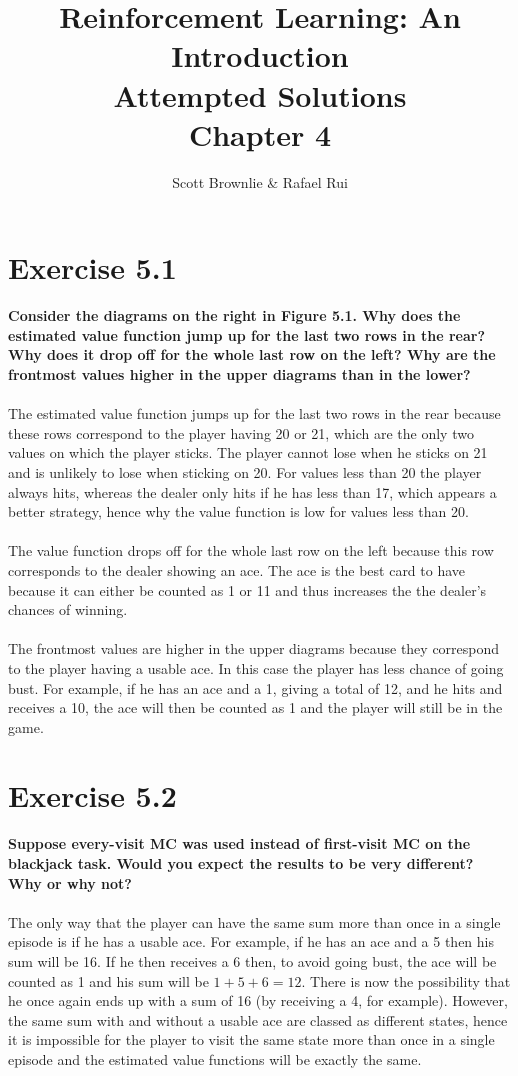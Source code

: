 \documentclass[a4paper,11pt]{article}
\title{Reinforcement Learning: An Introduction \\ Attempted Solutions \\ Chapter 4}
\author{Scott Brownlie \& Rafael Rui}
\date{}
\numberwithin{equation}{section}
\theoremstyle{remark}
\begin{document}
\maketitle

\section{Exercise 5.1}

\textbf{Consider the diagrams on the right in Figure 5.1. Why does the estimated value function jump up for the last two rows in the rear? Why does it drop off for the whole last row on the left? Why are the frontmost values higher in the upper diagrams than in the lower?}
\\ \\
The estimated value function jumps up for the last two rows in the rear because these rows correspond to the player having 20 or 21, which are the only two values on which the player sticks. The player cannot lose when he sticks on 21 and is unlikely to lose when sticking on 20. For values less than 20 the player always hits, whereas the dealer only hits if he has less than 17, which appears a better strategy, hence why the value function is low for values less than 20.
\\ \\
The value function drops off for the whole last row on the left because this row corresponds to the dealer showing an ace. The ace is the best card to have because it can either be counted as 1 or 11 and thus increases the the dealer's chances of winning.
\\ \\
The frontmost values are higher in the upper diagrams because they correspond to the player having a usable ace. In this case the player has less chance of going bust. For example, if he has an ace and a 1, giving a total of 12, and he hits and receives a 10, the ace will then be counted as 1 and the player will still be in the game. 

\section{Exercise 5.2}

\textbf{Suppose every-visit MC was used instead of first-visit MC on the blackjack task. Would you expect the results to be very different? Why or why not?}
\\ \\ 
The only way that the player can have the same sum more than once in a single episode is if he has a usable ace. For example, if he has an ace and a 5 then his sum will be 16. If he then receives a 6 then, to avoid going bust, the ace will be counted as 1 and his sum will be $1 + 5 + 6 = 12$. There is now the possibility that he once again ends up with a sum of 16 (by receiving a 4, for example). However, the same sum with and without a usable ace are classed as different states, hence it is impossible for the player to visit the same state more than once in a single episode and the estimated value functions will be exactly the same.
\end{document}

